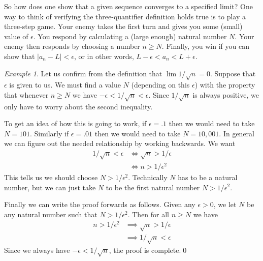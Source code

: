 \documentclass[11pt,oneside]{amsbook}
\theoremstyle{definition}
\theoremstyle{plain}
\theoremstyle{definition}
\theoremstyle{remark}
\newtheorem{example}[theorem]{Example}
\numberwithin{equation}{section}
\numberwithin{figure}{section}
\begin{document}
So how does one show that a given sequence converges to a specified limit? One way to think of verifying the three-quantifier definition holds true is to play a three-step game. Your enemy takes the first turn and gives you some (small) value of $\epsilon$. You respond by calculating a (large enough) natural number $N$. Your enemy then responds by choosing a number $n\geq N$. Finally, you win if you can show that $|a_n-L|<\epsilon$, or in other words, $L-\epsilon<a_n<L+\epsilon$.

\begin{example}
  Let us confirm from the definition that $\lim1/\sqrt{n}=0$. Suppose that $\epsilon$ is given to us. We must find a value $N$ (depending on this $\epsilon$) with the property that whenever $n\geq N$ we have $-\epsilon<1/\sqrt{n}<\epsilon$. Since $1/\sqrt{n}$ is always positive, we only have to worry about the second inequality.

  To get an idea of how this is going to work, if $\epsilon=.1$ then we would need to take $N=101$. Similarly if $\epsilon=.01$ then we would need to take $N=10,001$. In general we can figure out the needed relationship by working backwards. We want
  \begin{align*}
    1/\sqrt{n}<\epsilon &\iff \sqrt{n}>1/\epsilon\\
                        &\iff n>1/\epsilon^2
  \end{align*}
  This tells us we should choose $N>1/\epsilon^2$. Technically $N$ has to be a natural number, but we can just take $N$ to be the first natural number $N>1/\epsilon^2$.

  Finally we can write the proof forwards as follows. Given any $\epsilon>0$, we let $N$ be any natural number such that $N>1/\epsilon^2$. Then for all $n\geq N$ we have
  \begin{align*}
    n>1/\epsilon^2&\implies\sqrt{n}>1/\epsilon\\
                  &\implies1/\sqrt{n}<\epsilon
  \end{align*}
  Since we always have $-\epsilon<1/\sqrt{n}$, the proof is complete.\qed
\end{example}
\end{document}
